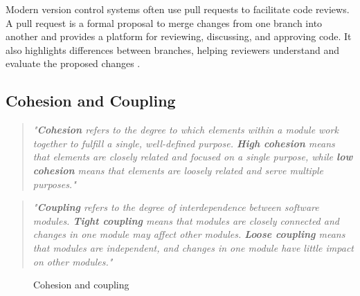 Modern version control systems often use pull requests to facilitate code reviews. A pull request is a formal proposal to merge changes from one branch into another and provides a platform for reviewing, discussing, and approving code. It also highlights differences between branches, helping reviewers understand and evaluate the proposed changes \cite{github:pr}.

\subsection{Cohesion and Coupling}
\label{subsec:cohesion-and-coupling}

\begin{quote}
\textit{"\textbf{Cohesion} refers to the degree to which elements within a module work together to fulfill a single, well-defined purpose. \textbf{High cohesion} means that elements are closely related and focused on a single purpose, while \textbf{low cohesion} means that elements are loosely related and serve multiple purposes."} \cite{geeksforgeeks:c&c} \\
\end{quote}

\begin{quote}
\textit{"\textbf{Coupling} refers to the degree of interdependence between software modules. \textbf{Tight coupling} means that modules are closely connected and changes in one module may affect other modules. \textbf{Loose coupling} means that modules are independent, and changes in one module have little impact on other modules."} \cite{geeksforgeeks:c&c} \\
\end{quote}

\begin{figure}[h!]
    \centering

    \caption[Cohesion and coupling]{Cohesion and coupling \cite{geeksforgeeks:c&c}}
    \label{fig:cohesion-coupling}
\end{figure}

